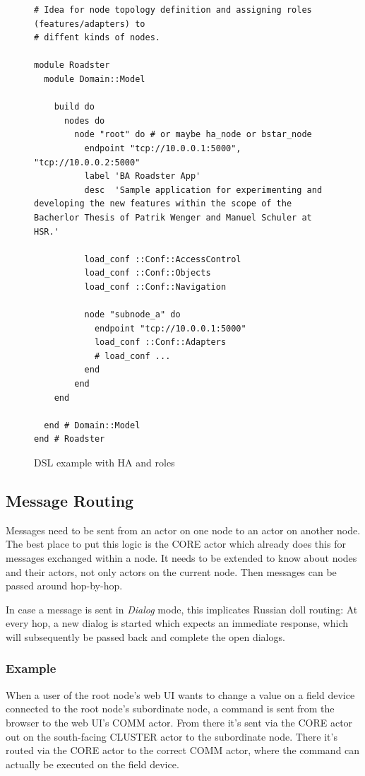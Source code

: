 \begin{figure}[]
\begin{lstlisting}[style=customruby]
# Idea for node topology definition and assigning roles (features/adapters) to
# diffent kinds of nodes.

module Roadster
  module Domain::Model

    build do
      nodes do
        node "root" do # or maybe ha_node or bstar_node
          endpoint "tcp://10.0.0.1:5000", "tcp://10.0.0.2:5000"
          label 'BA Roadster App'
          desc  'Sample application for experimenting and developing the new features within the scope of the Bacherlor Thesis of Patrik Wenger and Manuel Schuler at HSR.'

          load_conf ::Conf::AccessControl
          load_conf ::Conf::Objects
          load_conf ::Conf::Navigation

          node "subnode_a" do
            endpoint "tcp://10.0.0.1:5000"
            load_conf ::Conf::Adapters
            # load_conf ...
          end
        end
    end

  end # Domain::Model
end # Roadster
\end{lstlisting}
\caption{DSL example with HA and roles}
\label{lst:dsl:topo:with-roles}
\end{figure}


\subsection{Message Routing}
Messages need to be sent from an actor on one node to an actor on another node. The best place to put this logic is the CORE actor which already does this for messages exchanged within a node. It needs to be extended to know about nodes and their actors, not only actors on the current node. Then messages can be passed around hop-by-hop.

In case a message is sent in \emph{Dialog} mode, this implicates Russian doll routing: At every hop, a new dialog is started which expects an immediate response, which will subsequently be passed back and complete the open dialogs.

\subsubsection{Example}
When a user of the root node's web UI wants to change a value on a field device
connected to the root node's subordinate node, a command is sent from the
browser to the web UI's COMM actor. From there it's sent via the CORE actor out
on the south-facing CLUSTER actor to the subordinate node. There it's routed
via the CORE actor to the correct COMM actor, where the command can actually be
executed on the field device.


